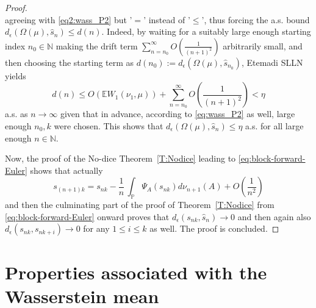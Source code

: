 \documentclass[12pt,reqno]{amsart}
\begin{document}
\begin{proof}
\begin{equation*}
\end{equation*}
agreeing with \eqref{eq2:wass_P2} but '$=$' instead of '$\leq $', thus forcing the a.s. bound $d_\epsilon(\Omega(\mu),\hat{s}_{n})\leq d(n)$. Indeed, by waiting for a suitably large enough starting index $n_0\in\mathbb{N}$ making the drift term $\sum_{n=n_0}^\infty O\!\left(\frac1{(n+1)^2}\right)$ arbitrarily small, and then choosing the starting term as $d(n_0):=d_\epsilon(\Omega(\mu),\hat{s}_{n_0})$, Etemadi SLLN yields $$d(n)\leq O\left(\mathbb{E}W_1(\nu_{1},\mu)\right)+\sum_{n=n_0}^\infty O\!\left(\frac1{(n+1)^2}\right)<\eta$$ a.s. as $n\to\infty$ given that in advance, according to \eqref{eq:wass_P2} as well, large enough $n_0, k$ were chosen. This shows that $d_\epsilon(\Omega(\mu),\hat{s}_{n})\leq \eta$ a.s. for all large enough $n\in\mathbb{N}$.

Now, the proof of the No-dice Theorem~\ref{T:Nodice} leading to \eqref{eq:block-forward-Euler} shows that actually
\begin{equation*}
s_{(n+1)k}=s_{nk}-\frac1n\,\int_{\mathbb{P}}\Psi_A(s_{nk})d\nu_{n+1}(A)+O\!\left(\frac1{n^2}\right)
\end{equation*}
and then the culminating part of the proof of Theorem~\ref{T:Nodice} from \eqref{eq:block-forward-Euler} onward proves that $d_\epsilon(s_{nk},\hat{s}_{n})\longrightarrow 0$ and then again also $d_\epsilon(s_{nk},s_{nk+i})\longrightarrow 0$ for any $1\leq i\leq k$ as well. The proof is concluded.
\end{proof}



\section{Properties associated with the Wasserstein mean}
\end{document}
